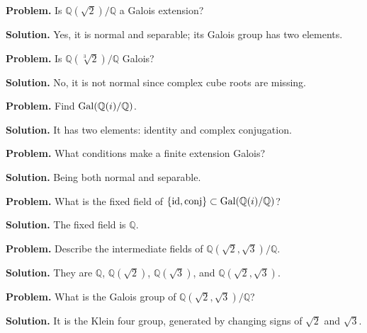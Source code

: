 \begin{example}\label{ex:sec6-1}
\textbf{Problem.} Is $\mathbb{Q}(\sqrt{2})/\mathbb{Q}$ a Galois extension?

\textbf{Solution.} Yes, it is normal and separable; its Galois group has two elements.
\end{example}

\begin{example}\label{ex:sec6-2}
\textbf{Problem.} Is $\mathbb{Q}(\sqrt[3]{2})/\mathbb{Q}$ Galois?

\textbf{Solution.} No, it is not normal since complex cube roots are missing.
\end{example}

\begin{example}\label{ex:sec6-3}
\textbf{Problem.} Find $\operatorname{Gal}(\mathbb{Q}(i)/\mathbb{Q})$.

\textbf{Solution.} It has two elements: identity and complex conjugation.
\end{example}

\begin{example}\label{ex:sec6-4}
\textbf{Problem.} What conditions make a finite extension Galois?

\textbf{Solution.} Being both normal and separable.
\end{example}

\begin{example}\label{ex:sec6-5}
\textbf{Problem.} What is the fixed field of $\{\text{id},\text{conj}\}\subset \operatorname{Gal}(\mathbb{Q}(i)/\mathbb{Q})$?

\textbf{Solution.} The fixed field is $\mathbb{Q}$.
\end{example}

\begin{example}\label{ex:sec6-6}
\textbf{Problem.} Describe the intermediate fields of $\mathbb{Q}(\sqrt{2},\sqrt{3})/\mathbb{Q}$.

\textbf{Solution.} They are $\mathbb{Q}$, $\mathbb{Q}(\sqrt{2})$, $\mathbb{Q}(\sqrt{3})$, and $\mathbb{Q}(\sqrt{2},\sqrt{3})$.
\end{example}

\begin{example}\label{ex:sec6-7}
\textbf{Problem.} What is the Galois group of $\mathbb{Q}(\sqrt{2},\sqrt{3})/\mathbb{Q}$?

\textbf{Solution.} It is the Klein four group, generated by changing signs of $\sqrt{2}$ and $\sqrt{3}$.
\end{example}

